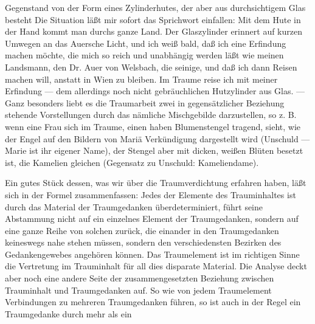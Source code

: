 \documentclass{article}
\begin{document}
         
            
            
            
        \pstart
        Gegenstand von der Form eines Zylinderhutes, der aber aus durchsichtigem Glas besteht Die Situation läßt mir sofort das Sprichwort einfallen: Mit dem Hute in der Hand kommt man durchs ganze
               Land. Der Glaszylinder erinnert auf kurzen Umwegen an das Auersche Licht, und ich
               weiß bald, daß ich eine Erfindung machen möchte, die mich so reich und
               unabhängig werden läßt wie meinen Landsmann, den Dr. Auer von Welsbach, die seinige, und daß ich dann Reisen machen
               will, anstatt in Wien zu bleiben. Im Traume reise ich mit meiner Erfindung
               — dem allerdings noch nicht gebräuchlichen Hutzylinder aus Glas. — Ganz
               besonders liebt es die Traumarbeit zwei in gegensätzlicher Beziehung
               stehende Vorstellungen durch das nämliche Mischgebilde darzustellen, so z. B.
               wenn eine Frau sich im Traume, einen haben Blumenstengel tragend, sieht, wie der
               Engel auf den Bildern von Mariä Verkündigung dargestellt wird (Unschuld —
               Marie ist ihr eigener Name), der Stengel aber mit dicken, weißen Blüten besetzt
               ist, die Kamelien gleichen (Gegensatz zu Unschuld: Kameliendame).
        \pend
    
            
        \pstart
        Ein gutes Stück dessen, was wir über die Traumverdichtung erfahren haben, läßt
               sich in der Formel zusammenfassen: Jedes der Elemente des Trauminhaltes ist
               durch das Material der Traumgedanken überdeterminiert, führt seine Abstammung nicht auf ein einzelnes
               Element der Traumgedanken, sondern auf eine ganze Reihe von solchen zurück, die
               einander in den Traumgedanken keineswegs nahe stehen müssen, sondern den
               verschiedensten Bezirken des Gedankengewebes angehören können. Das Traumelement
               ist im richtigen Sinne die Vertretung im
                  Trauminhalt für all dies disparate Material. Die Analyse deckt aber noch
               eine andere Seite der zusammengesetzten Beziehung zwischen Trauminhalt und
               Traumgedanken auf. So wie von jedem Traumelement Verbindungen zu
               mehreren Traumgedanken führen, so ist auch in der Regel ein Traumgedanke durch mehr als ein
        \pend
    
         
            
            
            
\end{document}
